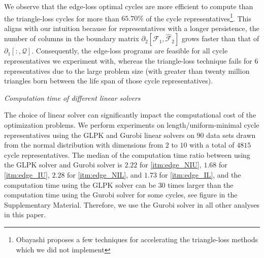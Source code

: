 
We observe that the edge-loss optimal cycles are more efficient to compute than the triangle-loss cycles for more than $65.70\%$ of the cycle representatives\footnote{Obayashi \cite{Obayashi2018} proposes a few techniques for accelerating the triangle-loss methods which we did not implement}. This aligns with our intuition because for representatives with a longer persistence, the number of columns in the boundary matrix $\partial_{2}[ \mathcal{F}_1 , \hat {\mathcal{F}}_{2} ]$ grows faster than that of $\partial_1[:, \mathcal{Q}]$. Consequently, the edge-loss programs are feasible for all cycle representatives we experiment with, whereas the triangle-loss technique fails for $6$ representatives due to the large problem size (with greater than twenty million triangles born between the life span of those cycle representatives).

\emph{Computation time of different linear solvers}

The choice of linear solver can significantly impact the computational cost of the optimization problems. We perform experiments on length/uniform-minimal cycle representatives using the GLPK \cite{glpk} and Gurobi \cite{gurobi} linear solvers on $90$ data sets drawn from the normal distribution with dimensions from $2$ to $10$ with a total of $4815$ cycle representatives. The median of the computation time ratio between using the GLPK solver and Gurobi solver is $2.22$ for \pr
\ref{itm:edge_NIU}, $1.68$ for \pr \ref{itm:edge_IU}, $2.28$ for \pr \ref{itm:edge_NIL}, and $1.73$ for \pr \ref{itm:edge_IL}, and the computation time using the GLPK solver can be $30$ times larger than the computation time using the Gurobi solver for some cycles, see figure in the Supplementary Material. Therefore, we use the Gurobi solver in all other analyses in this paper. 





